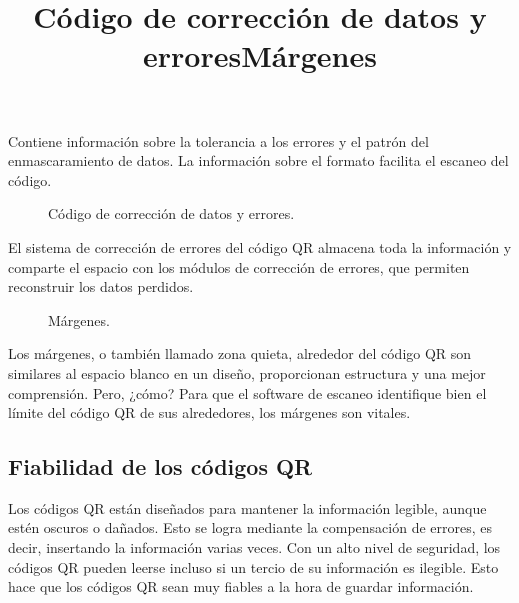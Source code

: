 Contiene información sobre la tolerancia a los errores y el patrón del enmascaramiento de datos. La información sobre el formato facilita el escaneo del código. \\

\newpage
\title{Código de corrección de datos y errores}

\begin{figure}[htbp]
	\begin{center}
		\caption{Código de corrección de datos y errores.}
		\label{fig:casosDeUso}
	\end{center}
\end{figure}

El sistema de corrección de errores del código QR almacena toda la información y comparte el espacio con los módulos de corrección de errores, que permiten reconstruir los datos perdidos. \\

\title{Márgenes}

\begin{figure}[htbp]
	\begin{center}
		\caption{Márgenes.}
		\label{fig:casosDeUso}
	\end{center}
\end{figure}

Los márgenes, o también llamado zona quieta, alrededor del código QR son similares al espacio blanco en un diseño, proporcionan estructura y una mejor comprensión. Pero, ¿cómo? Para que el software de escaneo identifique bien el límite del código QR de sus alrededores, los márgenes son vitales.

\subsection{Fiabilidad de los códigos QR}
Los códigos QR están diseñados para mantener la información legible, aunque estén oscuros o dañados. Esto se logra mediante la compensación de errores, es decir, insertando la información varias veces. Con un alto nivel de seguridad, los códigos QR pueden leerse incluso si un tercio de su información es ilegible. Esto hace que los códigos QR sean muy fiables a la hora de guardar información. \\

